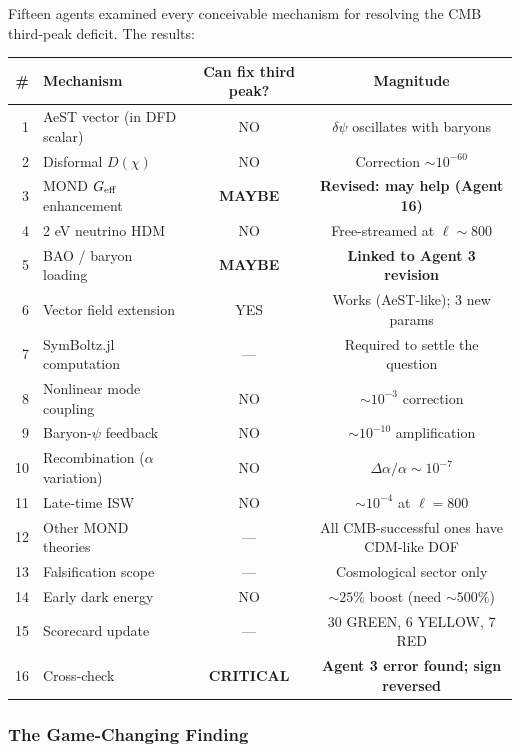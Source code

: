 \documentclass[11pt,a4paper]{article}
\begin{document}
Fifteen agents examined every conceivable mechanism for resolving the CMB third-peak deficit. The results:

\begin{center}
\begin{tabular}{rlcc}
\toprule
\textbf{\#} & \textbf{Mechanism} & \textbf{Can fix third peak?} & \textbf{Magnitude} \\
\midrule
1 & AeST vector (in DFD scalar) & NO & $\delta\psi$ oscillates with baryons \\
2 & Disformal $D(\chi)$ & NO & Correction $\sim 10^{-60}$ \\
3 & MOND $G_{\rm eff}$ enhancement & \textbf{MAYBE} & \textbf{Revised: may help (Agent 16)} \\
4 & 2 eV neutrino HDM & NO & Free-streamed at $\ell \sim 800$ \\
5 & BAO / baryon loading & \textbf{MAYBE} & \textbf{Linked to Agent 3 revision} \\
6 & Vector field extension & YES & Works (AeST-like); 3 new params \\
7 & SymBoltz.jl computation & --- & Required to settle the question \\
8 & Nonlinear mode coupling & NO & $\sim 10^{-3}$ correction \\
9 & Baryon-$\psi$ feedback & NO & $\sim 10^{-10}$ amplification \\
10 & Recombination ($\alpha$ variation) & NO & $\Delta\alpha/\alpha \sim 10^{-7}$ \\
11 & Late-time ISW & NO & $\sim 10^{-4}$ at $\ell = 800$ \\
12 & Other MOND theories & --- & All CMB-successful ones have CDM-like DOF \\
13 & Falsification scope & --- & Cosmological sector only \\
14 & Early dark energy & NO & $\sim 25\%$ boost (need $\sim 500\%$) \\
15 & Scorecard update & --- & 30 GREEN, 6 YELLOW, 7 RED \\
16 & Cross-check & \textbf{CRITICAL} & \textbf{Agent 3 error found; sign reversed} \\
\bottomrule
\end{tabular}
\end{center}

\subsubsection{The Game-Changing Finding}
\end{document}
